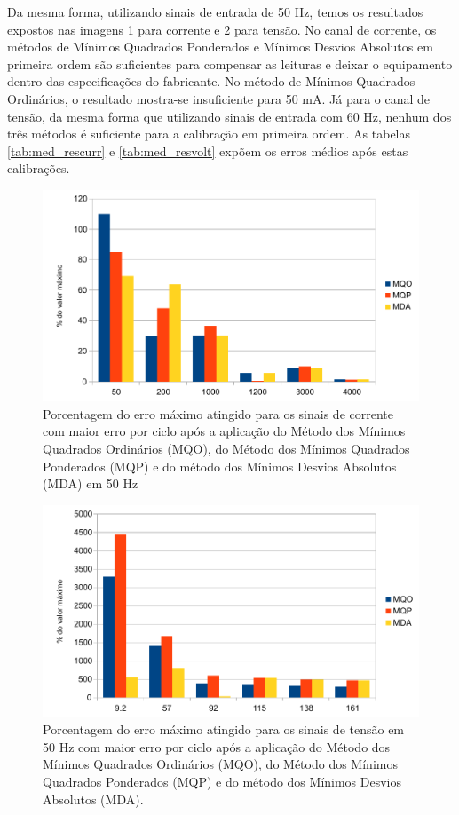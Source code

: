 Da mesma forma, utilizando sinais de entrada de 50 Hz, temos os resultados expostos nas imagens \ref{fig:res_curr50} para corrente e \ref{fig:res_volt50} para tensão. No canal de corrente, os métodos de Mínimos Quadrados Ponderados e Mínimos Desvios Absolutos em primeira ordem são suficientes para compensar as leituras e deixar o equipamento dentro das especificações do fabricante. No método de Mínimos Quadrados Ordinários, o resultado mostra-se insuficiente para 50 mA. Já para o canal de tensão, da mesma forma que utilizando sinais de entrada com 60 Hz, nenhum dos três métodos é suficiente para a calibração em primeira ordem. As tabelas \ref{tab:med_rescurr} e \ref{tab:med_resvolt} expõem os erros médios após estas calibrações.


\begin{figure}[H]
    \caption{Porcentagem do erro máximo atingido para os sinais de corrente com maior erro por ciclo após a aplicação do Método dos Mínimos Quadrados Ordinários (MQO), do Método dos Mínimos Quadrados Ponderados (MQP) e do método dos Mínimos Desvios Absolutos (MDA) em 50 Hz}
    \label{fig:res_curr50}
    \centering
    \includegraphics[width=0.9\linewidth]{pictures/max_err_IA_aftercalib50Hz.pdf}
\end{figure}

\begin{figure}[H]
    \caption{Porcentagem do erro máximo atingido para os sinais de tensão em 50 Hz com maior erro por ciclo após a aplicação do Método dos Mínimos Quadrados Ordinários (MQO), do Método dos Mínimos Quadrados Ponderados (MQP) e do método dos Mínimos Desvios Absolutos (MDA).}
    \label{fig:res_volt50}
    \centering
    \includegraphics[width=0.9\linewidth]{pictures/max_err_VC_aftercalib50Hz.pdf}
\end{figure}

